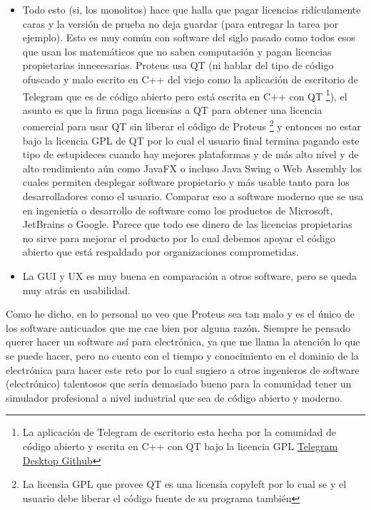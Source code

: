 \documentclass{article}
\begin{document}
\begin{itemize}
        \item Todo esto (si, los monolitos) hace que halla que pagar
        licencias ridículamente caras y la versión de prueba no deja
        guardar (para entregar la tarea por ejemplo). Esto es muy común
        con software del siglo pasado como todos esos que usan los
        matemáticos que no saben computación y pagan licencias
        propietarias innecesarias. Proteus usa QT (ni hablar del tipo
        de código ofuscado y malo escrito en C++ del viejo como la
        aplicación de escritorio de Telegram que es de código abierto
        pero está escrita en C++ con QT \footnote{La aplicación de
        Telegram de escritorio esta hecha por la comunidad de código
        abierto y escrita en C++ con QT bajo la licencia GPL
        \href{https://github.com/telegramdesktop/tdesktop}{Telegram
        Desktop Github}}), el asunto es que la firma paga licensias a
        QT para obtener una licencia comercial para usar QT sin liberar
        el código de Proteus \footnote{La licensia GPL que provee QT es
        una licensia copyleft por lo cual se  y el
        usuario debe liberar el código fuente de su programa también} y
        entonces no estar bajo la licencia GPL de QT por lo cual el
        usuario final termina pagando este tipo de estupideces cuando
        hay mejores plataformas y de más alto nivel y de alto
        rendimiento aún como JavaFX o incluso Java Swing o Web Assembly
        los cuales permiten desplegar software propietario y más usable
        tanto para los desarrolladores como el usuario. Comparar eso a
        software moderno que se usa en ingeniería o desarrollo de
        software como los productos de Microsoft, JetBrains o Google.
        Parece que todo ese dinero de las licencias propietarias no
        sirve para mejorar el producto por lo cual debemos apoyar el
        código abierto que está respaldado por organizaciones
        comprometidas.

        \item La GUI y UX es muy buena en comparación a otros software, pero
        se queda muy atrás en usabilidad.
    \end{itemize}

    Como he dicho, en lo personal no veo que Proteus sea tan malo y es el
    único de los software anticuados que me cae bien por alguna razón.
    Siempre he pensado querer hacer un software así para electrónica, ya que
    me llama la atención lo que se puede hacer, pero no cuento con el tiempo y
    conocimiento en el dominio de la electrónica para hacer este reto por lo
    cual sugiero a otros ingenieros de software (electrónico) talentosos que
    sería demasiado bueno para la comunidad tener un simulador profesional a
    nivel industrial que sea de código abierto y moderno.
\end{document}
